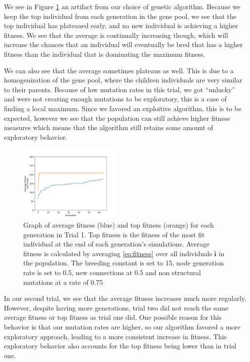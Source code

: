 \documentclass{article}
\begin{document}
We see in Figure \ref{fig:fitness graph} an artifact from our choice of genetic
algorithm. Because we keep the top individual from each generation in the gene
pool, we see that the top individual has plateaued early, and no new individual
is achieving a higher fitness. We see that the average is continually increasing
though, which will increase the chances that an individual will eventually be
bred that has a higher fitness than the individual that is dominating the
maximum fitness.

We can also see that the average sometimes plateaus as well. This is due to a
homogenization of the gene pool, where the children individuals are very
similar to their parents. Because of low mutation rates in this trial, we got
``unlucky'' and were not creating enough mutations to be exploratory, this is a
case of finding a local maximum. Since we favored an exploitive algorithm, this
is to be expected, however we see that the population can still achieve higher
fitness measures which means that the algorithm still retains some amount of
exploratory behavior.

\begin{figure}[h]\label{fig:fitness graph}
\centering
\includegraphics[width=0.45\textwidth]{fig_2}
\begin{changemargin}{0.15in}{0.15in}
  \caption{Graph of average fitness (blue) and top fitness (orange) for each
    generation in Trial 1. Top fitness is the fitness of the most fit individual
    at the end of each generation's simulations. Average fitness is calculated
    by averaging \eqref{eq:fitness} over all individuals $\bm{i}$ in the
    population. The breeding constant is set to 15, node generation rate is set
    to 0.5, new connections at 0.5 and non structural mutations at a rate of
    0.75}
\end{changemargin}
\end{figure}

In our second trial, we see that the average fitness increases much more
regularly. However, despite having more generations, trial two did not reach the
same average fitness or top fitness as trial one did. One possible reason for
this behavior is that our mutation rates are higher, so our algorithm favored a
more exploratory approach, leading to a more consistent increase in
fitness. This exploratory behavior also accounts for the top fitness being lower
than in trial one.
\end{document}
